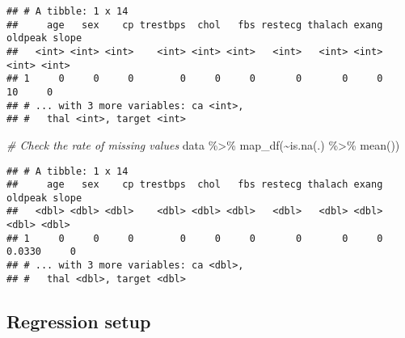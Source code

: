 \documentclass[
]{book}
\newenvironment{Shaded}{\begin{snugshade}}{\end{snugshade}}
\newcommand{\AttributeTok}[1]{\textcolor[rgb]{0.77,0.63,0.00}{#1}}
\newcommand{\CommentTok}[1]{\textcolor[rgb]{0.56,0.35,0.01}{\textit{#1}}}
\newcommand{\ConstantTok}[1]{\textcolor[rgb]{0.00,0.00,0.00}{#1}}
\newcommand{\DecValTok}[1]{\textcolor[rgb]{0.00,0.00,0.81}{#1}}
\newcommand{\FunctionTok}[1]{\textcolor[rgb]{0.00,0.00,0.00}{#1}}
\newcommand{\NormalTok}[1]{#1}
\newcommand{\OtherTok}[1]{\textcolor[rgb]{0.56,0.35,0.01}{#1}}
\newcommand{\SpecialCharTok}[1]{\textcolor[rgb]{0.00,0.00,0.00}{#1}}
\begin{document}
\begin{Shaded}
\end{Shaded}

\begin{verbatim}
## # A tibble: 1 x 14
##     age   sex    cp trestbps  chol   fbs restecg thalach exang oldpeak slope
##   <int> <int> <int>    <int> <int> <int>   <int>   <int> <int>   <int> <int>
## 1     0     0     0        0     0     0       0       0     0      10     0
## # ... with 3 more variables: ca <int>,
## #   thal <int>, target <int>
\end{verbatim}

\begin{Shaded}
\begin{Highlighting}[]
\CommentTok{\# Check the rate of missing values}
\NormalTok{data }\SpecialCharTok{\%\textgreater{}\%}
  \FunctionTok{map\_df}\NormalTok{(}\SpecialCharTok{\textasciitilde{}}\FunctionTok{is.na}\NormalTok{(.) }\SpecialCharTok{\%\textgreater{}\%} \FunctionTok{mean}\NormalTok{())}
\end{Highlighting}
\end{Shaded}

\begin{verbatim}
## # A tibble: 1 x 14
##     age   sex    cp trestbps  chol   fbs restecg thalach exang oldpeak slope
##   <dbl> <dbl> <dbl>    <dbl> <dbl> <dbl>   <dbl>   <dbl> <dbl>   <dbl> <dbl>
## 1     0     0     0        0     0     0       0       0     0  0.0330     0
## # ... with 3 more variables: ca <dbl>,
## #   thal <dbl>, target <dbl>
\end{verbatim}

\hypertarget{regression-setup}{%
\subsection{Regression setup}\label{regression-setup}}
\end{document}
